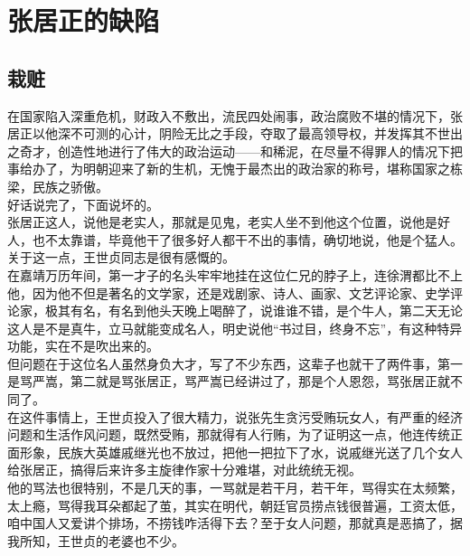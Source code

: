 \section{张居正的缺陷}
\ifnum{}
	\begin{multicols}{\theparacolNo}
\fi
\subsection{栽赃}
在国家陷入深重危机，财政入不敷出，流民四处闹事，政治腐败不堪的情况下，张居正以他深不可测的心计，阴险无比之手段，夺取了最高领导权，并发挥其不世出之奇才，创造性地进行了伟大的政治运动——和稀泥，在尽量不得罪人的情况下把事给办了，为明朝迎来了新的生机，无愧于最杰出的政治家的称号，堪称国家之栋梁，民族之骄傲。\\

好话说完了，下面说坏的。\\

张居正这人，说他是老实人，那就是见鬼，老实人坐不到他这个位置，说他是好人，也不太靠谱，毕竟他干了很多好人都干不出的事情，确切地说，他是个猛人。\\

关于这一点，王世贞同志是很有感慨的。\\

在嘉靖万历年间，第一才子的名头牢牢地挂在这位仁兄的脖子上，连徐渭都比不上他，因为他不但是著名的文学家，还是戏剧家、诗人、画家、文艺评论家、史学评论家，极其有名，有名到他头天晚上喝醉了，说谁谁不错，是个牛人，第二天无论这人是不是真牛，立马就能变成名人，明史说他“书过目，终身不忘”，有这种特异功能，实在不是吹出来的。\\

但问题在于这位名人虽然身负大才，写了不少东西，这辈子也就干了两件事，第一是骂严嵩，第二就是骂张居正，骂严嵩已经讲过了，那是个人恩怨，骂张居正就不同了。\\

在这件事情上，王世贞投入了很大精力，说张先生贪污受贿玩女人，有严重的经济问题和生活作风问题，既然受贿，那就得有人行贿，为了证明这一点，他连传统正面形象，民族大英雄戚继光也不放过，把他一把拉下了水，说戚继光送了几个女人给张居正，搞得后来许多主旋律作家十分难堪，对此统统无视。\\

他的骂法也很特别，不是几天的事，一骂就是若干月，若干年，骂得实在太频繁，太上瘾，骂得我耳朵都起了茧，其实在明代，朝廷官员捞点钱很普遍，工资太低，咱中国人又爱讲个排场，不捞钱咋活得下去？至于女人问题，那就真是恶搞了，据我所知，王世贞的老婆也不少。\\


\end{multicols}
